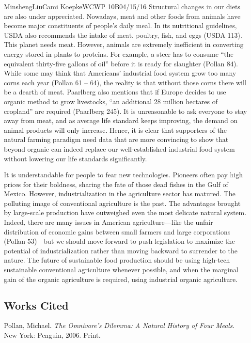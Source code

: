 \documentclass[12pt,letterpaper]{article}
\begin{document}
\begin{mla}{Minsheng}{Liu}{Cami Koepke}{WCWP 10B}{04/15/16}
Structural changes in our diets are also under appreciated. Nowadays,
meat and other foods from animals have become major constituents of
people's daily meal. In its nutritional guidelines, USDA also recommends
the intake of meat, poultry, fish, and eggs (USDA 113). This planet
needs meat. However, animals are extremely inefficient in converting
energy stored in plants to proteins. For example, a steer has to consume
``the equivalent thirty-five gallons of oil'' before it is ready for
slaughter (Pollan 84). While some may think that Americans' industrial
food system grow too many corns each year (Pollan 61 -- 64), the reality
is that without those corns there will be a dearth of meat. Paarlberg
also mentions that if Europe decides to use organic method to grow
livestocks, ``an additional 28 million hectares of cropland'' are
required (Paarlberg 245). It is unreasonable to ask everyone to stay
away from meat, and as average life standard keeps improving, the demand
on animal products will only increase. Hence, it is clear that
supporters of the natural farming paradigm need data that are more
convincing to show that beyond organic can indeed replace our
well-established industrial food system without lowering our life
standards significantly.

It is understandable for people to fear new technologies. Pioneers often
pay high prices for their boldness, sharing the fate of those dead
fishes in the Gulf of Mexico. However, industrialization in the
agriculture sector has matured. The polluting image of conventional
agriculture is the past. The advantages brought by large-scale
production have outweighed even the most delicate natural system.
Indeed, there are many issues in American agriculture---like the unfair
distribution of economic gains between small farmers and large
corporations (Pollan 53)---but we should move forward to push
legislation to maximize the potential of industrialization rather than
moving backward to surrender to the nature. The future of sustainable
food production should be using high-tech sustainable conventional
agriculture whenever possible, and when the marginal gain of the organic
agriculture is required, using industrial organic agriculture.


\subsection*{Works Cited}
\bibent Pollan, Michael. \textit{The Omnivore's Dilemma: A Natural History of Four Meals}. New York: Penguin, 2006. Print.


\end{mla}
\end{document}
